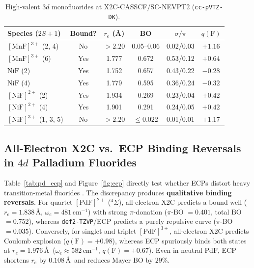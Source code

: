 \documentclass[10pt,twocolumn]{article}
\begin{document}
\begin{table}[t]
\centering
\caption{High-valent $3d$ monofluorides at X2C-CASSCF/SC-NEVPT2 (\texttt{cc-pVTZ-DK}).}
\label{tab:cations}
\scriptsize
\setlength{\tabcolsep}{2.4pt}
\begin{tabular}{@{}lccccc@{}}
\toprule
Species ($2S+1$) & Bound? & $r_e$ (\AA) & BO & $\sigma/\pi$ & $q(\mathrm{F})$ \\
\midrule
$[\mathrm{MnF}]^{3+}$ (2, 4) & No & $>2.20$ & 0.05--0.06 & 0.02/0.03 & $+1.16$ \\
$[\mathrm{MnF}]^{3+}$ (6) & Yes & 1.777 & 0.672 & 0.53/0.12 & $+0.64$ \\
$\mathrm{NiF}$ (2) & Yes & 1.752 & 0.657 & 0.43/0.22 & $-0.28$ \\
$\mathrm{NiF}$ (4) & Yes & 1.779 & 0.595 & 0.36/0.24 & $-0.32$ \\
$[\mathrm{NiF}]^{2+}$ (2) & Yes & 1.934 & 0.269 & 0.23/0.04 & $+0.42$ \\
$[\mathrm{NiF}]^{2+}$ (4) & Yes & 1.901 & 0.291 & 0.24/0.05 & $+0.42$ \\
$[\mathrm{NiF}]^{3+}$ (1, 3, 5) & No & $>2.20$ & $\le 0.022$ & 0.01/0.01 & $+1.17$ \\
\bottomrule
\end{tabular}
\end{table}

\subsection{All-Electron X2C vs.\ ECP Binding Reversals in $4d$ Palladium Fluorides}
Table~\ref{tab:pd_ecp} and Figure~\ref{fig:ecp} directly test whether ECPs distort heavy transition-metal fluorides \cite{kleber2025,pyykko2012}. The discrepancy produces \textbf{qualitative binding reversals}. For quartet $[\mathrm{PdF}]^{2+}$ ($^4\Sigma$), all-electron X2C predicts a bound well ($r_e = 1.838\,$\AA, $\omega_e = 481\,\mathrm{cm}^{-1}$) with strong $\pi$-donation ($\pi$-BO $= 0.401$, total BO $= 0.752$), whereas \texttt{def2-TZVP}/ECP predicts a purely repulsive curve ($\pi$-BO $= 0.035$). Conversely, for singlet and triplet $[\mathrm{PdF}]^{3+}$, all-electron X2C predicts Coulomb explosion ($q(\mathrm{F}) = +0.98$), whereas ECP spuriously binds both states at $r_e = 1.976\,$\AA\ ($\omega_e \approx 582\,\mathrm{cm}^{-1}$, $q(\mathrm{F}) = +0.67$). Even in neutral $\mathrm{PdF}$, ECP shortens $r_e$ by $0.108\,$\AA\ and reduces Mayer BO by $29\%$.
\end{document}

